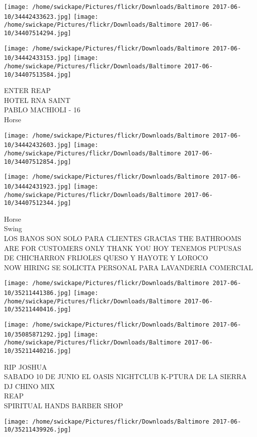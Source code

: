 \documentclass[10pt,letterpaper]{article}
\begin{document}
\texttt{[image: /home/swickape/Pictures/flickr/Downloads/Baltimore 2017-06-10/34442433623.jpg]}
\texttt{[image: /home/swickape/Pictures/flickr/Downloads/Baltimore 2017-06-10/34407514294.jpg]}

\texttt{[image: /home/swickape/Pictures/flickr/Downloads/Baltimore 2017-06-10/34442433153.jpg]}
\texttt{[image: /home/swickape/Pictures/flickr/Downloads/Baltimore 2017-06-10/34407513584.jpg]}

ENTER REAP\\
HOTEL RNA SAINT\\
PABLO MACHIOLI {-} 16\\
Horse
\pagebreak

\texttt{[image: /home/swickape/Pictures/flickr/Downloads/Baltimore 2017-06-10/34442432603.jpg]}
\texttt{[image: /home/swickape/Pictures/flickr/Downloads/Baltimore 2017-06-10/34407512854.jpg]}

\texttt{[image: /home/swickape/Pictures/flickr/Downloads/Baltimore 2017-06-10/34442431923.jpg]}
\texttt{[image: /home/swickape/Pictures/flickr/Downloads/Baltimore 2017-06-10/34407512344.jpg]}

Horse\\
Swing\\
LOS BANOS SON SOLO PARA CLIENTES GRACIAS THE BATHROOMS ARE FOR CUSTOMERS ONLY THANK YOU HOY TENEMOS PUPUSAS DE CHICHARRON FRIJOLES QUESO Y HAYOTE Y LOROCO\\
NOW HIRING SE SOLICITA PERSONAL PARA LAVANDERIA COMERCIAL
\pagebreak

\texttt{[image: /home/swickape/Pictures/flickr/Downloads/Baltimore 2017-06-10/35211441386.jpg]}
\texttt{[image: /home/swickape/Pictures/flickr/Downloads/Baltimore 2017-06-10/35211440416.jpg]}

\texttt{[image: /home/swickape/Pictures/flickr/Downloads/Baltimore 2017-06-10/35085871292.jpg]}
\texttt{[image: /home/swickape/Pictures/flickr/Downloads/Baltimore 2017-06-10/35211440216.jpg]}

RIP JOSHUA\\
SABADO 10 DE JUNIO EL OASIS NIGHTCLUB K{-}PTURA DE LA SIERRA DJ CHINO MIX\\
REAP\\
SPIRITUAL HANDS BARBER SHOP
\pagebreak

\texttt{[image: /home/swickape/Pictures/flickr/Downloads/Baltimore 2017-06-10/35211439926.jpg]}
\end{document}
